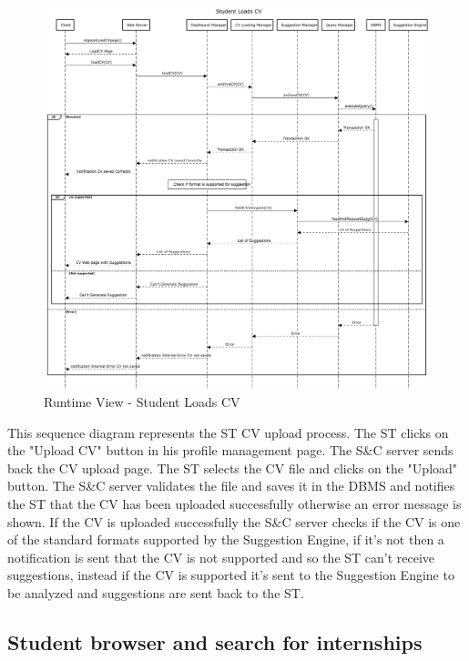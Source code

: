 \begin{figure}[H]
      \centering
      \includegraphics[width=1.0\textwidth]{Images/RV_02.pdf}
      \caption{Runtime View - Student Loads CV}
      \label{fig:rv-student-loads-cv}
\end{figure}

\par This sequence diagram represents the ST CV upload process. The ST clicks on the "Upload CV" button in his profile 
management page. The S\&C server sends back the CV upload page. The ST selects the CV file and clicks on the "Upload" button.
The S\&C server validates the file and saves it in the DBMS and notifies the ST that the CV has been uploaded successfully
otherwise an error message is shown. If the CV is uploaded successfully the S\&C server checks if the CV is one of the 
standard formats supported by the Suggestion Engine, if it's not then a notification is sent that the CV is not supported and
so the ST can't receive suggestions, instead if the CV is supported it's sent to the Suggestion Engine to be analyzed and
suggestions are sent back to the ST.

\subsection{Student browser and search for internships}
\label{sub:student-browser-and-search-for-internships}%

